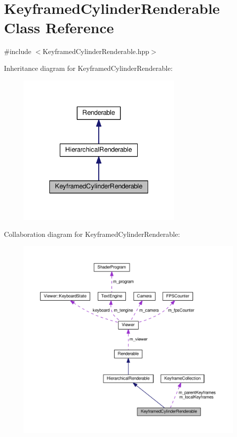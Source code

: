 \hypertarget{classKeyframedCylinderRenderable}{\section{Keyframed\+Cylinder\+Renderable Class Reference}
\label{classKeyframedCylinderRenderable}
}


{\ttfamily \#include $<$Keyframed\+Cylinder\+Renderable.\+hpp$>$}



Inheritance diagram for Keyframed\+Cylinder\+Renderable\+:\nopagebreak
\begin{figure}[H]
\begin{center}
\leavevmode
\includegraphics[width=228pt]{classKeyframedCylinderRenderable__inherit__graph}
\end{center}
\end{figure}


Collaboration diagram for Keyframed\+Cylinder\+Renderable\+:\nopagebreak
\begin{figure}[H]
\begin{center}
\leavevmode
\includegraphics[width=350pt]{classKeyframedCylinderRenderable__coll__graph}
\end{center}
\end{figure}
